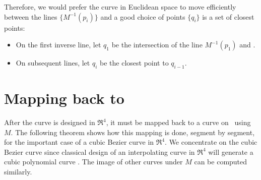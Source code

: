 Therefore, we would prefer the curve in Euclidean space to move
efficiently between the lines $\{M^{-1}(p_i)\}$
and a good choice of points $\{q_i\}$ is a set of closest points:
	
\begin{itemize}
\item On the first inverse line, let $q_1$ be the intersection
of the line $M^{-1}(p_1)$ and .
\item On subsequent lines, let $q_i$ be the closest point to $q_{i-1}$.
\end{itemize}

\section{Mapping back to }
\label{sec:curveimage}

After the curve is designed in $\Re^4$, it must be mapped back to a curve
on \ using $M$.
The following theorem shows how this mapping is done, segment by segment,
for the important case of a cubic Bezier curve in $\Re^4$.
We concentrate on the cubic Bezier curve since classical design of an 
interpolating curve in $\Re^4$ will generate
a cubic polynomial curve \cite{farin97}.	%
The image of other curves under $M$ can be computed similarly.

